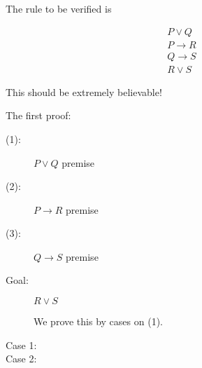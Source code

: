 \documentclass[12pt]{article}
\begin{document}
The rule to be verified is

$$\begin{array}{c}

P \vee Q \\

P \rightarrow R \\

Q \rightarrow S \\ \hline 

R \vee S

\end{array}$$

This should be extremely believable!

\newpage

The first proof:

\begin{description}

\item[(1):]  $P \vee Q$  premise

\item[(2):]  $P \rightarrow R$ premise

\item[(3):]  $Q \rightarrow S$  premise

\item[Goal:]  $R \vee S$

We prove this by cases on (1).

\item[Case 1:]



\item[Case 2:]


\end{description}
\end{document}
